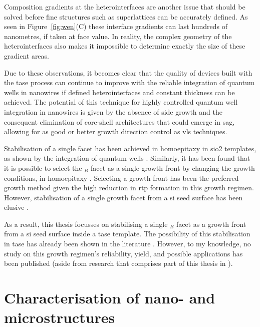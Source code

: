 Composition gradients at the heterointerfaces are another issue that should be solved before fine structures such as superlattices can be accurately defined. As seen in Figure~\ref{fig:wen}(C) these interface gradients can last hundreds of nanometres, if taken at face value. In reality, the complex geometry of the heterointerfaces also makes it impossible to determine exactly the size of these gradient areas.

Due to these observations, it becomes clear that the quality of devices built with the \acs{tase} process can continue to improve with the reliable integration of quantum wells in nanowires if defined heterointerfaces and constant thickness can be achieved. The potential of this technique for highly controlled quantum well integration in nanowires is given by the absence of side growth and the consequent elimination of core-shell architectures that could emerge in \acs{sag}, allowing for as good or better growth direction control as \acs{vls} techniques.

Stabilisation of a single  facet has been achieved in homoepitaxy in \acs{sio2} templates, as shown by the integration of quantum wells \cite{Brunelli2019}. Similarly, it has been found that it is possible to select the \(_B\) facet as a single growth front by changing the growth conditions, in homoepitaxy \cite{Goswami2020}. Selecting a  growth front has been the preferred growth method given the high reduction in \acs{rtp} formation in this growth regimen. However, stabilisation of a single  growth facet from a  \acl{si} seed surface has been elusive \cite{Knoedler2017}.

As a result, this thesis focusses on stabilising a single \(_B\) facet as a growth front from a  \acl{si} seed surface inside a \acs{tase} template. The possibility of this stabilisation in \acs{tase} has already been shown in the literature \cite{Ritter2021, Borg2015}. However, to my knowledge, no study on this growth regimen's reliability, yield, and possible applications has been published (aside from research that comprises part of this thesis in \cite{Brugnolotto2023, Brugnolotto2023_2}).

\section{Characterisation of nano- and microstructures}

